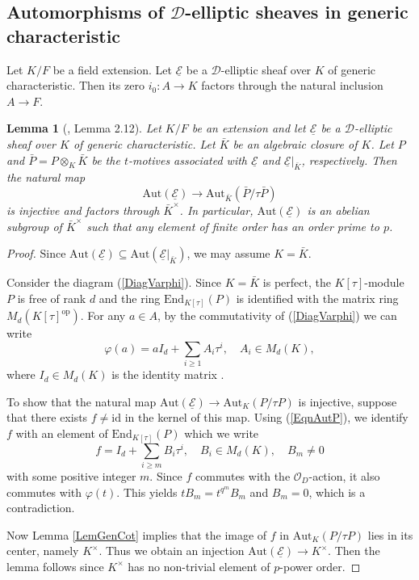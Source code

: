 \documentclass[10pt]{amsart}
\theoremstyle{plain}
\newtheorem{lem}[thm]{Lemma}
\theoremstyle{definition}
\newcommand{\Aut}{\mathrm{Aut}}
\newcommand{\End}{\mathrm{End}}
\newcommand{\id}{\mathrm{id}}
\newcommand{\opp}{\mathrm{op}}
\newcommand{\cO}{\mathcal{O}}
\newcommand{\ucE}{\underline{\mathcal{E}}}
\newcommand{\sD}{\mathscr{D}}
\begin{document}
\subsection{Automorphisms of $\sD$-elliptic sheaves in generic characteristic}\label{SubsecAutGen}

Let $K/F$ be a field extension. Let $\ucE$ be a $\sD$-elliptic sheaf over $K$ of generic characteristic. Then its zero $i_{0}:A\to K$ factors through 
the natural inclusion $A\to F$.

\begin{lem}[\cite{Pap}, Lemma 2.12]\label{LemAutComm}
	Let $K/F$ be an extension and let $\ucE$ be a $\sD$-elliptic sheaf over $K$ of generic characteristic. 
	Let $\bar{K}$ be an algebraic closure of $K$. 
	Let $P$ and $\bar{P}=P\otimes_K \bar{K}$ be the $t$-motives associated with $\ucE$ and $\ucE|_{\bar{K}}$, respectively. 
	Then the natural map
	\[
	\Aut(\ucE)\to \Aut_{\bar{K}}(\bar{P}/\tau \bar{P})
	\]
	is injective and factors through $\bar{K}^\times$. In particular,
	$\Aut(\ucE)$ is an abelian subgroup of $\bar{K}^\times$ such that any element of finite order has an order prime to $p$.
\end{lem}
\begin{proof}
	Since $\Aut(\ucE)\subseteq \Aut(\ucE|_{\bar{K}})$,
	we may assume $K=\bar{K}$.
	
	
	
	Consider the diagram (\ref{DiagVarphi}).
	Since $K=\bar{K}$ is perfect, the $K[\tau]$-module $P$ is free of rank $d$ and the ring $\End_{K[\tau]}(P)$ is identified with the 
	matrix ring
	$M_d(K[\tau]^\opp)$. For any $a\in A$, by the commutativity of (\ref{DiagVarphi}) we can write
	\[
	\varphi(a)=aI_d+\sum_{i\geq 1} A_i \tau^i, \quad A_i\in M_d(K),
	\]
	where $I_d\in M_d(K)$ is the identity matrix .
	
	To show that the natural map $\Aut(\ucE)\to \Aut_{K}(P/\tau P)$ is injective,
	suppose that there exists $f\neq \id$ in the kernel of this map. 
	Using (\ref{EqnAutP}), we identify $f$ with an element of $\End_{{K}[\tau]}({P})$ which we write
	\[
	f=I_d+\sum_{i\geq m} B_i \tau^i, \quad B_i\in M_d(K),\quad B_m\neq 0
	\]
	with some positive integer $m$. 
	Since $f$ commutes with the $\cO_D$-action, it also commutes with $\varphi(t)$.
	This yields $tB_m=t^{q^m}B_m$ and $B_m=0$, which is a contradiction.
	
	Now Lemma \ref{LemGenCot} implies that 
	the image of $f$ in $\Aut_K(P/\tau P)$
	lies in its center, namely $K^\times$. Thus we obtain an injection $\Aut(\ucE)\to K^\times$.
	Then the lemma follows since $K^\times $ has no non-trivial element of $p$-power order. 
\end{proof}
\end{document}
